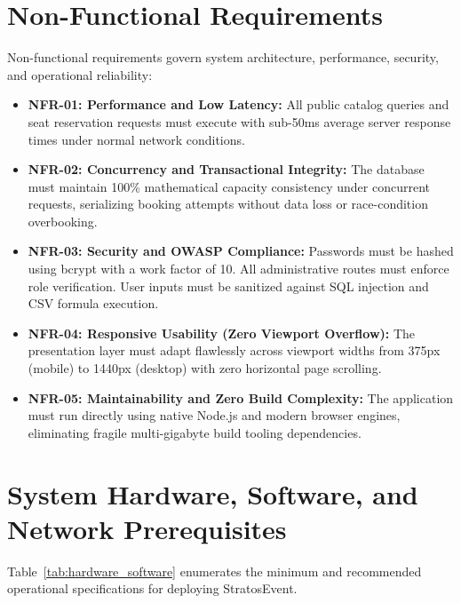 \documentclass[11pt,a4paper]{report}
\begin{document}
\section{Non-Functional Requirements}
\justifying
Non-functional requirements govern system architecture, performance, security, and operational reliability:
\begin{itemize}[leftmargin=1.5em, itemsep=0.5em]
    \item \textbf{NFR-01: Performance and Low Latency:} All public catalog queries and seat reservation requests must execute with sub-50ms average server response times under normal network conditions.
    \item \textbf{NFR-02: Concurrency and Transactional Integrity:} The database must maintain 100\% mathematical capacity consistency under concurrent requests, serializing booking attempts without data loss or race-condition overbooking.
    \item \textbf{NFR-03: Security and OWASP Compliance:} Passwords must be hashed using bcrypt with a work factor of 10. All administrative routes must enforce role verification. User inputs must be sanitized against SQL injection and CSV formula execution.
    \item \textbf{NFR-04: Responsive Usability (Zero Viewport Overflow):} The presentation layer must adapt flawlessly across viewport widths from 375px (mobile) to 1440px (desktop) with zero horizontal page scrolling.
    \item \textbf{NFR-05: Maintainability and Zero Build Complexity:} The application must run directly using native Node.js and modern browser engines, eliminating fragile multi-gigabyte build tooling dependencies.
\end{itemize}

\section{System Hardware, Software, and Network Prerequisites}
\justifying
Table~\ref{tab:hardware_software} enumerates the minimum and recommended operational specifications for deploying StratosEvent.
\end{document}

